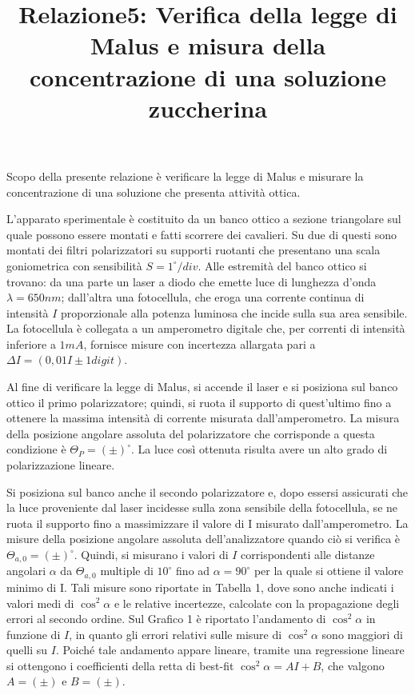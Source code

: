 \documentclass{article}
\title{Relazione5: Verifica della legge di Malus e misura della concentrazione di una soluzione zuccherina}
\date{}
\begin{document}
		
	\maketitle
	
	Scopo della presente relazione è verificare la legge di Malus e misurare la concentrazione di una soluzione che presenta attività ottica. 
	
	L'apparato sperimentale è costituito da un banco ottico a sezione triangolare sul quale possono essere montati e fatti scorrere dei cavalieri. Su due di questi sono montati dei filtri polarizzatori su supporti ruotanti che presentano una scala goniometrica con sensibilità $S=1^{\circ}/div$. Alle estremità del banco ottico si trovano: da una parte un laser a diodo che emette luce di lunghezza d'onda $\lambda=650nm$; dall'altra una fotocellula, che eroga una corrente continua di intensità $I$ proporzionale alla potenza luminosa che incide sulla sua area sensibile. La fotocellula è collegata a un amperometro digitale che, per correnti di intensità inferiore a $1mA$, fornisce misure con incertezza allargata pari a $\Delta I = (0,01 I \pm 1 digit)$.
	
	Al fine di verificare la legge di Malus, si accende il laser e si posiziona sul banco ottico il primo polarizzatore; quindi, si ruota il supporto di quest'ultimo fino a ottenere la massima intensità di corrente misurata dall'amperometro. La misura della posizione angolare assoluta del polarizzatore che corrisponde a questa condizione è $\Theta_P=(\pm)^{\circ}$.
	La luce così ottenuta risulta avere un alto grado di polarizzazione lineare.
	
	Si posiziona sul banco anche il secondo polarizzatore e, dopo essersi assicurati che la luce proveniente dal laser incidesse sulla zona sensibile della fotocellula, se ne ruota il supporto fino a massimizzare il valore di I misurato dall'amperometro. La misure della posizione angolare assoluta dell'analizzatore quando ciò si verifica è $\Theta_{a,0}=(\pm)^{\circ}$. Quindi, si misurano i valori di $I$ corrispondenti alle distanze angolari $\alpha$ da $\Theta_{a,0}$ multiple di $10^{\circ}$ fino ad $\alpha=90^{\circ}$ per la quale si ottiene il valore minimo di I. Tali misure sono riportate in Tabella 1, dove sono anche indicati i valori medi di $\cos^2\alpha$ e le relative incertezze, calcolate con la propagazione degli errori al secondo ordine. Sul Grafico 1 è riportato l'andamento di $\cos^2\alpha$ in funzione di $I$, in quanto gli errori relativi sulle misure di  $\cos^2\alpha$ sono maggiori di quelli su $I$. Poiché tale andamento appare lineare, tramite una regressione lineare si ottengono i coefficienti della retta di best-fit $\cos^2\alpha = A I + B$, che valgono $A=(\pm)$ e $B=(\pm)$.	
	
\end{document}
